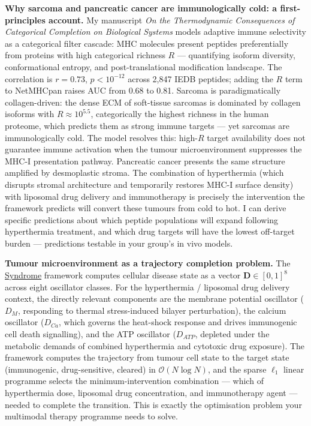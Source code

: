 \documentclass[12pt,a4paper]{article}
\begin{document}
\textbf{Why sarcoma and pancreatic cancer are immunologically cold: a first-principles account.}
My manuscript \textit{On the Thermodynamic Consequences of Categorical Completion
on Biological Systems} models adaptive immune selectivity as a categorical filter
cascade: MHC molecules present peptides preferentially from proteins with high
categorical richness $R$ --- quantifying isoform diversity, conformational entropy,
and post-translational modification landscape. The correlation is $r = 0.73$,
$p < 10^{-12}$ across 2,847 IEDB peptides; adding the $R$ term to NetMHCpan
raises AUC from 0.68 to 0.81.
Sarcoma is paradigmatically collagen-driven: the dense ECM of soft-tissue
sarcomas is dominated by collagen isoforms with $R \approx 10^{5.5}$,
categorically the highest richness in the human proteome, which predicts
them as strong immune targets --- yet sarcomas are immunologically cold.
The model resolves this: high-$R$ target availability does not guarantee
immune activation when the tumour microenvironment suppresses the
MHC-I presentation pathway. Pancreatic cancer presents the same structure
amplified by desmoplastic stroma. The combination of hyperthermia (which
disrupts stromal architecture and temporarily restores MHC-I surface density)
with liposomal drug delivery and immunotherapy is precisely the intervention
the framework predicts will convert these tumours from cold to hot.
I can derive specific predictions about which peptide populations will expand
following hyperthermia treatment, and which drug targets will have the lowest
off-target burden --- predictions testable in your group's in vivo models.

\textbf{Tumour microenvironment as a trajectory completion problem.}
The \href{https://github.com/fullscreen-triangle/syndrome}{Syndrome} framework
computes cellular disease state as a vector $\mathbf{D} \in [0,1]^8$ across
eight oscillator classes. For the hyperthermia / liposomal drug delivery
context, the directly relevant components are the membrane potential oscillator
($D_M$, responding to thermal stress-induced bilayer perturbation), the calcium
oscillator ($D_{Ca}$, which governs the heat-shock response and drives
immunogenic cell death signalling), and the ATP oscillator ($D_{ATP}$, depleted
under the metabolic demands of combined hyperthermia and cytotoxic drug exposure).
The framework computes the trajectory from tumour cell state to the target
state (immunogenic, drug-sensitive, cleared) in $\mathcal{O}(N \log N)$, and
the sparse $\ell_1$ linear programme selects the minimum-intervention combination
--- which of hyperthermia dose, liposomal drug concentration, and immunotherapy
agent --- needed to complete the transition. This is exactly the optimisation
problem your multimodal therapy programme needs to solve.
\end{document}
